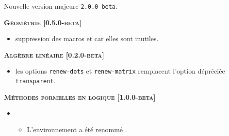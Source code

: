 \documentclass[12pt,a4paper]{book}
\begin{document}
\begin{description}
\separation

\end{description}\begin{description}
\medskip
\item[2021-03-01] Nouvelle version majeure \verb+2.0.0-beta+.




\begin{center}
    \textbf{\textsc{Géométrie [0.5.0-beta]}}
\end{center}

\begin{itemize}[itemsep=.5em]
    \item {}
          suppression des macros  et  car elles sont inutiles.


\end{itemize}


\separation




\begin{center}
    \textbf{\textsc{Algèbre linéaire [0.2.0-beta]}}
\end{center}

\begin{itemize}[itemsep=.5em]
    \item {}
          les options \verb#renew-dots# et \verb#renew-matrix# remplacent l'option dépréciée \verb#transparent#.


\end{itemize}


\separation




\begin{center}
    \textbf{\textsc{Méthodes formelles en logique [1.0.0-beta]}}
\end{center}

\begin{itemize}[itemsep=.5em]
    \item {}
    \begin{itemize}[itemsep=.5em]
        \item L'environnement  a été renommé .


\end{itemize}
\end{itemize}
\end{description}
\end{document}
